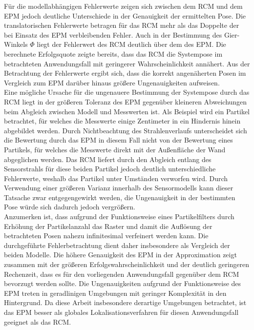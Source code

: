 Für die modellabhängigen Fehlerwerte zeigen sich zwischen dem RCM und dem EPM jedoch deutliche Unterschiede in der Genauigkeit der ermittelten Pose. Die translatorischen Fehlerwerte betragen für das RCM mehr als das Doppelte der bei Einsatz des EPM verbleibenden Fehler. Auch in der Bestimmung des Gier-Winkels $\Phi$ liegt der Fehlerwert des RCM deutlich über dem des EPM. Die berechnete Erfolgsquote zeigte bereits, dass das RCM die Systempose im betrachteten Anwendungsfall mit geringerer Wahrscheinlichkeit annähert. Aus der Betrachtung der Fehlerwerte ergibt sich, dass die korrekt angenäherten Posen im Vergleich zum EPM darüber hinaus größere Ungenauigkeiten aufweisen.\\

Eine mögliche Ursache für die ungenauere Bestimmung der Systempose durch das RCM liegt in der größeren Toleranz des EPM gegenüber kleineren Abweichungen beim Abgleich zwischen Modell und Messwerten ist. Als Beispiel wird ein Partikel betrachtet, für welches die Messwerte einige Zentimeter in ein Hindernis hinein abgebildet werden. Durch Nichtbeachtung des Strahlenverlaufs unterscheidet sich die Bewertung durch das EPM in diesem Fall nicht von der Bewertung eines Partikels, für welches die Messwerte direkt mit der Außenfläche der Wand abgeglichen werden. Das RCM liefert durch den Abgleich entlang des Sensorstrahls für diese beiden Partikel jedoch deutlich unterschiedliche Fehlerwerte, weshalb das Partikel unter Umständen verworfen wird. Durch Verwendung einer größeren Varianz innerhalb des Sensormodells kann dieser Tatsache zwar entgegengewirkt werden, die Ungenauigkeit in der bestimmten Pose würde sich dadurch jedoch vergrößern.\\

Anzumerken ist, dass aufgrund der Funktionsweise eines Partikelfilters durch Erhöhung der Partikelanzahl das Raster und damit die Auflösung der betrachteten Posen nahezu infinitesimal verfeinert werden kann. Die durchgeführte Fehlerbetrachtung dient daher insbesondere als Vergleich der beiden Modelle. Die höhere Genauigkeit des EPM in der Approximation zeigt zusammen mit der größeren Erfolgswahrscheinlichkeit und der deutlich geringeren Rechenzeit, dass es für den vorliegenden Anwendungsfall gegenüber dem RCM bevorzugt werden sollte. Die Ungenauigkeiten aufgrund der Funktionsweise des EPM treten in geradlinigen Umgebungen mit geringer Komplexität in den Hintergrund. Da diese Arbeit insbesondere derartige Umgebungen betrachtet, ist das EPM besser als globales Lokalisationsverfahren für diesen Anwendungsfall geeignet als das RCM.

